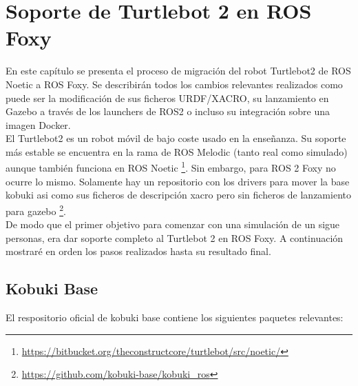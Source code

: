 \chapter{Soporte de Turtlebot 2 en ROS Foxy}
\label{cap:capitulo4}

En este capítulo se presenta el proceso de migración del robot Turtlebot2 de ROS Noetic a ROS Foxy. Se describirán todos los cambios relevantes realizados como puede ser la modificación de sus ficheros URDF/XACRO, su lanzamiento en Gazebo a través de los launchers de ROS2 o incluso su integración sobre una imagen Docker.\\

El Turtlebot2 es un robot móvil de bajo coste usado en la enseñanza. Su soporte más estable se encuentra en la rama de ROS Melodic (tanto real como simulado) aunque también funciona en ROS Noetic \footnote{\url{https://bitbucket.org/theconstructcore/turtlebot/src/noetic/}}. Sin embargo, para ROS 2 Foxy no ocurre lo mismo. Solamente hay un repositorio con los drivers para mover la base kobuki asi como sus ficheros de descripción xacro pero sin ficheros de lanzamiento para gazebo \footnote{\url{https://github.com/kobuki-base/kobuki_ros}}.\\

De modo que el primer objetivo para comenzar con una simulación de un sigue personas, era dar soporte completo al Turtlebot 2 en ROS Foxy. A continuación mostraré en orden los pasos realizados hasta su resultado final.


\section{Kobuki Base}
\label{sec:kobuki_base}

El respositorio oficial de kobuki base contiene los siguientes paquetes relevantes:

